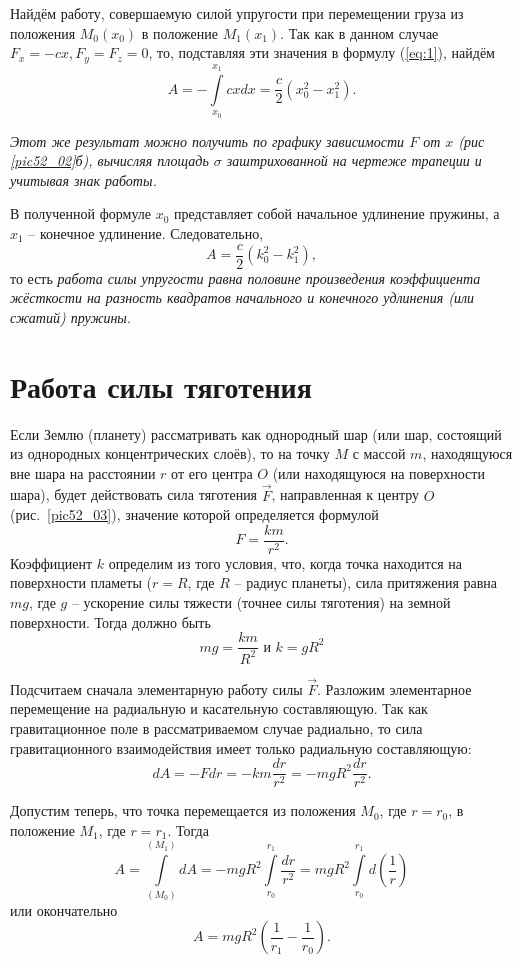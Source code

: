 Найдём работу, совершаемую силой упругости при перемещении груза из 
положения \( M_0(x_0) \) в положение \( M_1(x_1) \). Так как в данном 
случае \( F_x = -cx, F_y = F_z = 0 \), то, подставляя эти значения в 
формулу (\ref{eq:1}), найдём
\[ 
    A = - \int\limits_{x_0}^{x_1} cxdx = 
    \frac{c}{2} \left( x^{2}_0 - x^{2}_1 \right).
\]

\emph{Этот же результат можно получить по графику зависимости 
\( F \) от \( x \) (рис \ref{pic52_02}б), вычисляя площадь \( \sigma \) 
заштрихованной на чертеже трапеции и учитывая знак работы.}

В полученной формуле \( x_0 \) представляет собой начальное удлинение 
пружины, а \( x_1 \) -- конечное удлинение. 
Следовательно, 
\[
    A = \frac{c}{2} \left( k^{2}_0 - k^{2}_1 \right),
\]
то есть \emph{работа силы упругости равна половине произведения 
коэффициента жёсткости на разность квадратов начального и конечного 
удлинения (или сжатий) пружины.}

\section{Работа силы тяготения}
Если Землю (планету) рассматривать как однородный шар (или шар, 
состоящий из однородных концентрических слоёв), то на точку \( M \) с 
массой \( m \), находящуюся вне шара на расстоянии \( r \) от его 
центра \( O \) (или находящуюся на поверхности шара), будет действовать 
сила тяготения \( \vec{F} \), направленная к центру \( O \)
(рис.~\ref{pic52_03}), значение которой определяется формулой 
\[
    F = \frac{km}{r^2}.
\]
Коэффициент \( k \) определим из того условия, что, когда точка 
находится на поверхности пламеты (\( r = R \), где \( R \) -- радиус планеты), 
сила притяжения равна \( mg \), где \( g \) -- ускорение силы тяжести 
(точнее силы тяготения) на земной поверхности. Тогда должно быть
\[ mg = \frac{km}{R^2} \text{ и } k = gR^2 \]

Подсчитаем сначала элементарную работу силы \( \vec{F} \). Разложим элементарное
перемещение на радиальную и касательную составляющую. Так как гравитационное
поле в рассматриваемом случае радиально, то сила гравитационного взаимодействия
имеет только радиальную составляющую:
\[
    dA = -Fdr = -km\frac{dr}{r^2} = -mgR^2 \frac{dr}{r^2}.
\]

Допустим теперь, что точка перемещается из положения \( M_0 \), где 
\( r = r_0 \), в положение \( M_1 \), где \( r = r_1 \). Тогда 
\[ 
    A = \int\limits_{(M_0)}^{(M_1)} dA = 
    -mgR^2 \int\limits_{r_0}^{r_1} \frac{dr}{r^2} =
    mgR^2 \int\limits_{r_0}^{r_1} d\left( \frac{1}{r} \right)
\]
или окончательно
\[
    A = mgR^2 \left( \frac{1}{r_1} - \frac{1}{r_0} \right).
\]

\newpage
